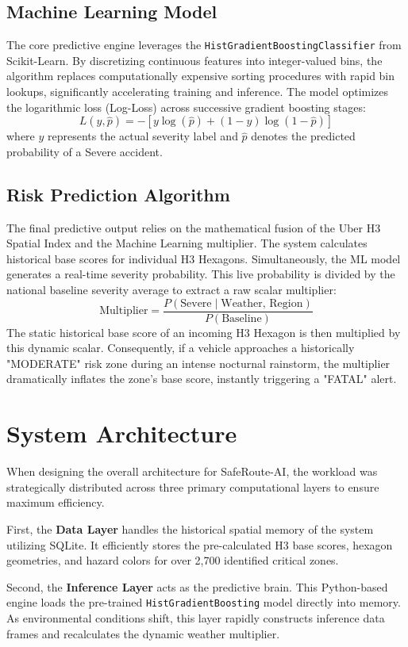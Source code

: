 \documentclass[conference]{IEEEtran}
\begin{document}
\subsection{Machine Learning Model}
The core predictive engine leverages the \texttt{HistGradientBoostingClassifier} from Scikit-Learn. By discretizing continuous features into integer-valued bins, the algorithm replaces computationally expensive sorting procedures with rapid bin lookups, significantly accelerating training and inference. The model optimizes the logarithmic loss (Log-Loss) across successive gradient boosting stages:
$$ L(y, \hat{p}) = - \left[ y \log(\hat{p}) + (1 - y) \log(1 - \hat{p}) \right] $$
where $y$ represents the actual severity label and $\hat{p}$ denotes the predicted probability of a Severe accident.

\subsection{Risk Prediction Algorithm}
The final predictive output relies on the mathematical fusion of the Uber H3 Spatial Index and the Machine Learning multiplier. The system calculates historical base scores for individual H3 Hexagons. Simultaneously, the ML model generates a real-time severity probability. This live probability is divided by the national baseline severity average to extract a raw scalar multiplier:
$$ \text{Multiplier} = \frac{P(\text{Severe} \mid \text{Weather, Region})}{P(\text{Baseline})} $$
The static historical base score of an incoming H3 Hexagon is then multiplied by this dynamic scalar. Consequently, if a vehicle approaches a historically "MODERATE" risk zone during an intense nocturnal rainstorm, the multiplier dramatically inflates the zone's base score, instantly triggering a "FATAL" alert.

\section{System Architecture}
When designing the overall architecture for SafeRoute-AI, the workload was strategically distributed across three primary computational layers to ensure maximum efficiency.

First, the \textbf{Data Layer} handles the historical spatial memory of the system utilizing SQLite. It efficiently stores the pre-calculated H3 base scores, hexagon geometries, and hazard colors for over 2,700 identified critical zones. 

Second, the \textbf{Inference Layer} acts as the predictive brain. This Python-based engine loads the pre-trained \texttt{HistGradientBoosting} model directly into memory. As environmental conditions shift, this layer rapidly constructs inference data frames and recalculates the dynamic weather multiplier.
\end{document}
